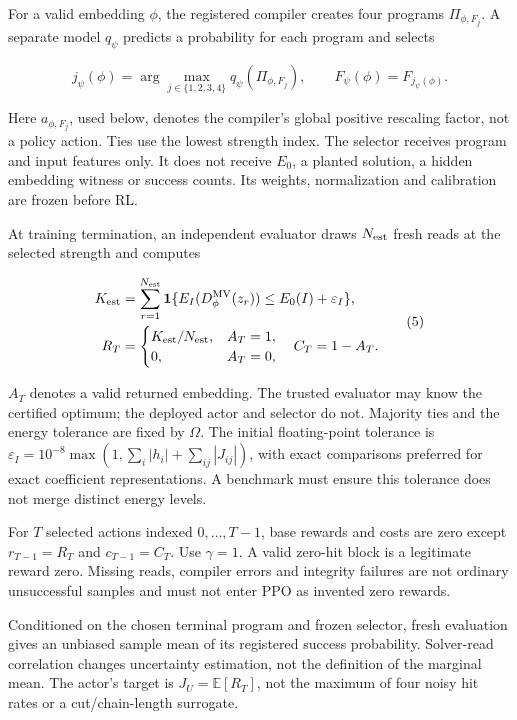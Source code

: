 \documentclass[10pt,a4paper]{article}
\begin{document}
For a valid embedding \(\phi\), the registered compiler creates four
programs \(\Pi_{\phi,F_j}\). A separate model \(q_\psi\) predicts a
probability for each program and selects

\[
j_\psi(\phi)=\arg\max_{j\in\{1,2,3,4\}}q_\psi(\Pi_{\phi,F_j}),
\qquad F_\psi(\phi)=F_{j_\psi(\phi)}.
\tag{4}
\]

Here \(a_{\phi,F_j}\), used below, denotes the compiler's global
positive rescaling factor, not a policy action. Ties use the lowest
strength index. The selector receives program and input features only.
It does not receive \(E_0\), a planted solution, a hidden embedding
witness or success counts. Its weights, normalization and calibration
are frozen before RL.

At training termination, an independent evaluator draws \(N_{\rm est}\)
fresh reads at the selected strength and computes

\[
\begin{aligned}
K_{\rm est}&=\sum_{r=1}^{N_{\rm est}}
\mathbf1\{E_I(D_\phi^{\rm MV}(z_r))\le E_0(I)+\varepsilon_I\},\\
R_T&=\begin{cases}K_{\rm est}/N_{\rm est},&A_T=1,\\0,&A_T=0,\end{cases}
\quad C_T=1-A_T.
\end{aligned}
\tag{5}
\]

\(A_T\) denotes a valid returned embedding. The trusted evaluator may
know the certified optimum; the deployed actor and selector do not.
Majority ties and the energy tolerance are fixed by \(\Omega\). The
initial floating-point tolerance is
\(\varepsilon_I=10^{-8}\max(1,\sum_i|h_i|+\sum_{ij}|J_{ij}|)\), with
exact comparisons preferred for exact coefficient representations. A
benchmark must ensure this tolerance does not merge distinct energy
levels.

For \(T\) selected actions indexed \(0,\ldots,T-1\), base rewards and
costs are zero except \(r_{T-1}=R_T\) and \(c_{T-1}=C_T\). Use
\(\gamma=1\). A valid zero-hit block is a legitimate reward zero.
Missing reads, compiler errors and integrity failures are not ordinary
unsuccessful samples and must not enter PPO as invented zero rewards.

Conditioned on the chosen terminal program and frozen selector, fresh
evaluation gives an unbiased sample mean of its registered success
probability. Solver-read correlation changes uncertainty estimation, not
the definition of the marginal mean. The actor's target is
\(J_U=\mathbb E[R_T]\), not the maximum of four noisy hit rates or a
cut/chain-length surrogate.
\end{document}
